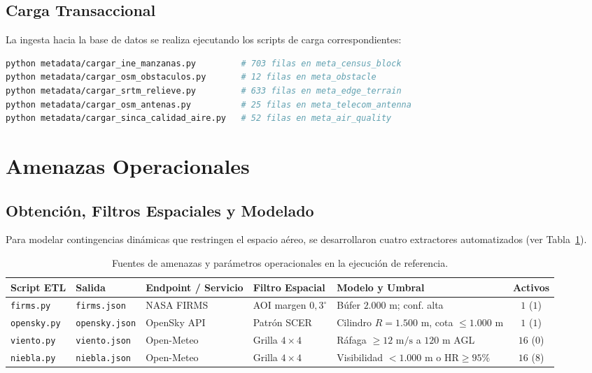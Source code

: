 \documentclass[letterpaper,12pt]{article}
\begin{document}
\subsection{Carga Transaccional}
\label{subsec:metadata_carga}

La ingesta hacia la base de datos se realiza ejecutando los scripts de carga correspondientes:
\begin{lstlisting}[language=bash]
python metadata/cargar_ine_manzanas.py         # 703 filas en meta_census_block
python metadata/cargar_osm_obstaculos.py       # 12 filas en meta_obstacle
python metadata/cargar_srtm_relieve.py         # 633 filas en meta_edge_terrain
python metadata/cargar_osm_antenas.py          # 25 filas en meta_telecom_antenna
python metadata/cargar_sinca_calidad_aire.py   # 52 filas en meta_air_quality
\end{lstlisting}

\section{Amenazas Operacionales}
\label{sec:amenazas}

\subsection{Obtención, Filtros Espaciales y Modelado}
\label{subsec:amenazas_obtencion}

Para modelar contingencias dinámicas que restringen el espacio aéreo, se desarrollaron cuatro extractores automatizados (ver Tabla~\ref{tab:amenazas}).

\begin{table}[H]
\centering
\small
\caption{Fuentes de amenazas y parámetros operacionales en la ejecución de referencia.}
\label{tab:amenazas}
\begin{tabularx}{\linewidth}{p{2.2cm}p{2.2cm}p{2.8cm}p{2.8cm}Xc}
\toprule
\textbf{Script ETL} & \textbf{Salida} & \textbf{Endpoint / Servicio} & \textbf{Filtro Espacial} & \textbf{Modelo y Umbral} & \textbf{Activos} \\
\midrule
\texttt{firms.py} & \texttt{firms.json} & NASA FIRMS \cite{firms} & AOI margen $0{,}3^\circ$ & Búfer $2.000\text{ m}$; conf. alta \cite{schroeder} & $1$ ($1$) \\
\addlinespace
\texttt{opensky.py} & \texttt{opensky.json} & OpenSky API \cite{opensky} & Patrón SCER & Cilindro $R=1.500\text{ m}$, cota $\le 1.000\text{ m}$ & $1$ ($1$) \\
\addlinespace
\texttt{viento.py} & \texttt{viento.json} & Open-Meteo \cite{openmeteo} & Grilla $4 \times 4$ & Ráfaga $\ge 12\text{ m/s}$ a $120\text{ m}$ AGL & $16$ ($0$) \\
\addlinespace
\texttt{niebla.py} & \texttt{niebla.json} & Open-Meteo \cite{openmeteo} & Grilla $4 \times 4$ & Visibilidad $<1.000\text{ m}$ o $\text{HR} \ge 95$\% & $16$ ($8$) \\
\bottomrule
\end{tabularx}
\end{table}
\end{document}
